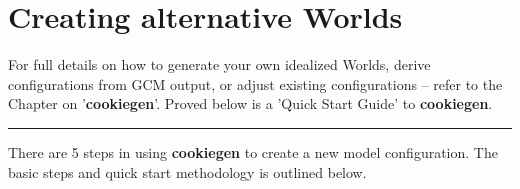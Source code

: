 \newpage

\section{Creating alternative Worlds}

For full details on how to generate your own idealized Worlds, derive configurations from GCM output, or adjust existing configurations -- refer to the Chapter on '\textbf{cookiegen}'. Proved below is a 'Quick Start Guide' to \textbf{cookiegen}.

\vspace{1mm}\noindent\rule{4cm}{0.5pt}\vspace{2mm}

\noindent There are 5 steps in using \textbf{cookiegen} to create a new model configuration. The basic steps and quick start methodology is outlined below.

